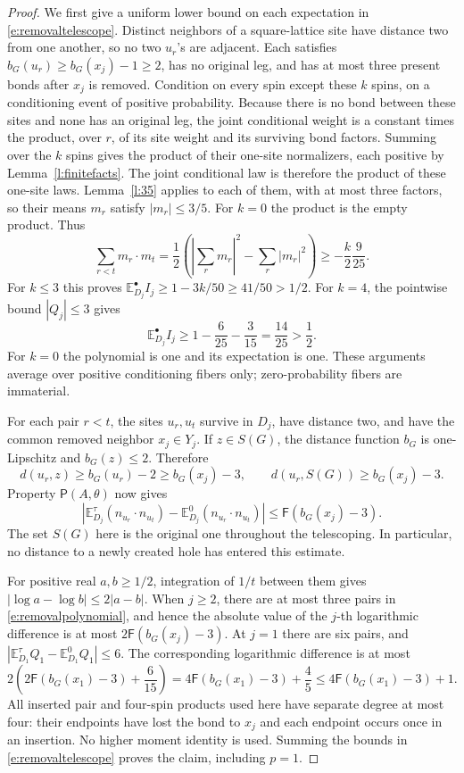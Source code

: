 \begin{proof}
We first give a uniform lower bound on each expectation in
\eqref{e:removaltelescope}.  Distinct neighbors of a square-lattice
site have distance two from one another, so no two \(u_r\)'s are
adjacent.  Each satisfies \(b_G(u_r)\ge b_G(x_j)-1\ge2\),
has no original leg, and has at most three present bonds after
\(x_j\) is removed.  Condition on every spin except these
\(k\) spins, on a conditioning event of positive probability.
Because there is no bond between these sites and none has an original
leg, the joint conditional weight is a constant times the product,
over \(r\), of its site weight and its surviving bond factors.
Summing over the \(k\) spins gives the product of their one-site
normalizers, each positive by Lemma~\ref{l:finitefacts}.
The joint conditional law is therefore the product of these
one-site laws.  Lemma~\ref{l:35} applies to each of them, with at
most three factors, so their means \(m_r\) satisfy \(|m_r|\le3/5\).
For \(k=0\) the product is the empty product.  Thus
\[
 \sum_{r<t}m_r\cdot m_t
    =\frac12\left(\left|\sum_r m_r\right|^2
                                  -\sum_r|m_r|^2\right)
    \ge-\frac{k}{2}\frac9{25}.
\]
For \(k\le3\) this proves
\(\mathbb E_{D_j}^\bullet I_j\ge1-3k/50\ge41/50>1/2\).
For \(k=4\), the pointwise bound \(|Q_j|\le3\) gives
\[
 \mathbb E_{D_j}^\bullet I_j
       \ge1-\frac6{25}-\frac3{15}
       =\frac{14}{25}>\frac12.
\]
For \(k=0\) the polynomial is one and its expectation is one.
These arguments average over positive conditioning fibers only;
zero-probability fibers are immaterial.

For each pair \(r<t\), the sites \(u_r,u_t\) survive in
\(D_j\), have distance two, and have the common removed neighbor
\(x_j\in Y_j\).  If \(z\in S(G)\), the distance function
\(b_G\) is one-Lipschitz and \(b_G(z)\le2\).  Therefore
\[
 d(u_r,z)\ge b_G(u_r)-2\ge b_G(x_j)-3,
 \qquad d(u_r,S(G))\ge b_G(x_j)-3.
\]
Property \(\mathsf P(A,\theta)\) now gives
\[
 \left|\mathbb E_{D_j}^\tau(n_{u_r}\cdot n_{u_t})
             -\mathbb E_{D_j}^0(n_{u_r}\cdot n_{u_t})\right|
       \le \mathsf F(b_G(x_j)-3).
\]
The set \(S(G)\) here is the original one throughout the
telescoping.  In particular, no distance to a newly created hole
has entered this estimate.

For positive real \(a,b\ge1/2\), integration of \(1/t\)
between them gives \(|\log a-\log b|\le2|a-b|\).
When \(j\ge2\), there are at most three pairs in
\eqref{e:removalpolynomial}, and hence the absolute value of
the \(j\)-th logarithmic difference is at most
\(2\mathsf F(b_G(x_j)-3)\).  At \(j=1\) there are six pairs,
and \(|\mathbb E_{D_1}^\tau Q_1-\mathbb E_{D_1}^0Q_1|\le6\).
The corresponding logarithmic difference is at most
\[
 2\left(2\mathsf F(b_G(x_1)-3)+\frac6{15}\right)
       =4\mathsf F(b_G(x_1)-3)+\frac45
       \le4\mathsf F(b_G(x_1)-3)+1.
\]
All inserted pair and four-spin products used here have separate
degree at most four: their endpoints have lost the bond to \(x_j\)
and each endpoint occurs once in an insertion.  No higher moment
identity is used.  Summing the bounds in
\eqref{e:removaltelescope} proves the claim, including \(p=1\).
\end{proof}

